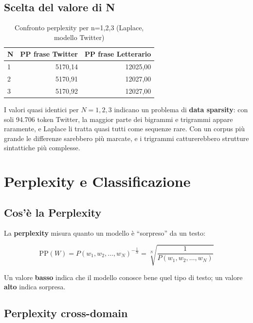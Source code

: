 \documentclass[12pt, a4paper]{article}
\begin{document}
\subsection{Scelta del valore di N}

\begin{table}[H]
\centering
\begin{tabular}{lrr}
\toprule
\textbf{N} & \textbf{PP frase Twitter} & \textbf{PP frase Letterario} \\
\midrule
1 & 5170,14 & 12025,00 \\
2 & 5170,91 & 12027,00 \\
3 & 5170,92 & 12027,00 \\
\bottomrule
\end{tabular}
\caption{Confronto perplexity per n=1,2,3 (Laplace, modello Twitter)}
\end{table}

I valori quasi identici per $N=1,2,3$ indicano un problema di
\textbf{data sparsity}: con soli 94.706 token Twitter, la maggior
parte dei bigrammi e trigrammi appare raramente, e Laplace li tratta
quasi tutti come sequenze rare. Con un corpus più grande le differenze
sarebbero più marcate, e i trigrammi catturerebbero strutture
sintattiche più complesse.

\section{Perplexity e Classificazione}

\subsection{Cos'è la Perplexity}

La \textbf{perplexity} misura quanto un modello è ``sorpreso'' da un testo:

\begin{equation}
\text{PP}(W) = P(w_1, w_2, \ldots, w_N)^{-\frac{1}{N}} =
\sqrt[N]{\frac{1}{P(w_1, w_2, \ldots, w_N)}}
\end{equation}

Un valore \textbf{basso} indica che il modello conosce bene quel tipo
di testo; un valore \textbf{alto} indica sorpresa.

\subsection{Perplexity cross-domain}
\end{document}

